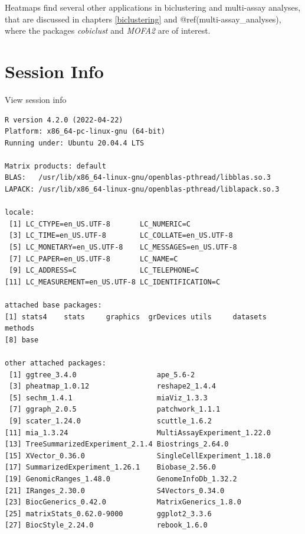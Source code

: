 \documentclass[
]{book}
\begin{document}
Heatmaps find several other applications in biclustering and multi-assay
analyses, that are discussed in chapters \ref{biclustering} and
@ref(multi-assay\_analyses), where the packages \emph{cobiclust} and \emph{MOFA2} are of interest.

\hypertarget{session-info-10}{%
\section*{Session Info}\label{session-info-10}}

View session info

\begin{verbatim}
R version 4.2.0 (2022-04-22)
Platform: x86_64-pc-linux-gnu (64-bit)
Running under: Ubuntu 20.04.4 LTS

Matrix products: default
BLAS:   /usr/lib/x86_64-linux-gnu/openblas-pthread/libblas.so.3
LAPACK: /usr/lib/x86_64-linux-gnu/openblas-pthread/liblapack.so.3

locale:
 [1] LC_CTYPE=en_US.UTF-8       LC_NUMERIC=C              
 [3] LC_TIME=en_US.UTF-8        LC_COLLATE=en_US.UTF-8    
 [5] LC_MONETARY=en_US.UTF-8    LC_MESSAGES=en_US.UTF-8   
 [7] LC_PAPER=en_US.UTF-8       LC_NAME=C                 
 [9] LC_ADDRESS=C               LC_TELEPHONE=C            
[11] LC_MEASUREMENT=en_US.UTF-8 LC_IDENTIFICATION=C       

attached base packages:
[1] stats4    stats     graphics  grDevices utils     datasets  methods  
[8] base     

other attached packages:
 [1] ggtree_3.4.0                   ape_5.6-2                     
 [3] pheatmap_1.0.12                reshape2_1.4.4                
 [5] sechm_1.4.1                    miaViz_1.3.3                  
 [7] ggraph_2.0.5                   patchwork_1.1.1               
 [9] scater_1.24.0                  scuttle_1.6.2                 
[11] mia_1.3.24                     MultiAssayExperiment_1.22.0   
[13] TreeSummarizedExperiment_2.1.4 Biostrings_2.64.0             
[15] XVector_0.36.0                 SingleCellExperiment_1.18.0   
[17] SummarizedExperiment_1.26.1    Biobase_2.56.0                
[19] GenomicRanges_1.48.0           GenomeInfoDb_1.32.2           
[21] IRanges_2.30.0                 S4Vectors_0.34.0              
[23] BiocGenerics_0.42.0            MatrixGenerics_1.8.0          
[25] matrixStats_0.62.0-9000        ggplot2_3.3.6                 
[27] BiocStyle_2.24.0               rebook_1.6.0                  


\end{verbatim}
\end{document}
